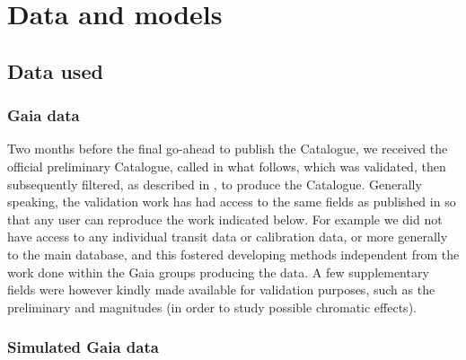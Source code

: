 \section{Data and models}\label{sec:description}

\subsection{Data used}\label{data}

\subsubsection{Gaia data}\label{gaia-data}
Two months before the final go-ahead to publish the {} Catalogue, we received the 
official preliminary Catalogue, called {} in what follows, which was validated,
then subsequently filtered, as described in , to produce the {} Catalogue.
Generally speaking, the validation work has had access to the same fields as
published in {} so that any user can reproduce the work indicated below. For 
example we did not have access to any individual transit data or calibration data,
or more generally to the main {\gaia} database, and this
fostered developing methods independent from the work done within the Gaia 
groups producing the data.
A few supplementary fields were however kindly made available for validation
purposes, such as the preliminary {\gbp} and {\grp} magnitudes (in order to study possible 
chromatic effects).

\subsubsection{Simulated Gaia data}\label{simulated-gaia-data}\label{agislab}

